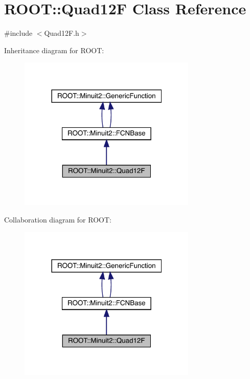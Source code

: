 \hypertarget{classROOT_1_1Minuit2_1_1Quad12F}{}\section{R\+O\+OT\+:\+:Quad12F Class Reference}
\label{classROOT_1_1Minuit2_1_1Quad12F}


{\ttfamily \#include $<$Quad12\+F.\+h$>$}



Inheritance diagram for R\+O\+OT\+:\nopagebreak
\begin{figure}[H]
\begin{center}
\leavevmode
\includegraphics[width=240pt]{d2/db0/classROOT_1_1Minuit2_1_1Quad12F__inherit__graph}
\end{center}
\end{figure}


Collaboration diagram for R\+O\+OT\+:\nopagebreak
\begin{figure}[H]
\begin{center}
\leavevmode
\includegraphics[width=240pt]{d7/dbe/classROOT_1_1Minuit2_1_1Quad12F__coll__graph}
\end{center}
\end{figure}
